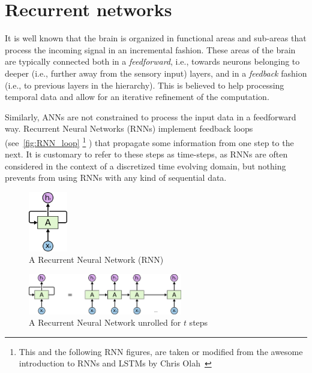 \section{Recurrent networks}\label{sec:rnn}
%
It is well known that the brain is organized in functional areas and sub-areas
that process the incoming signal in an incremental fashion. These areas of the
brain are typically connected both in a \emph{feedforward}, i.e., towards
neurons belonging to deeper (i.e., further away from the sensory input) layers,
and in a \emph{feedback} fashion (i.e., to previous layers in the hierarchy).
This is believed to help processing temporal data and allow for an iterative
refinement of the computation.

Similarly, ANNs are not constrained to process the input data in a feedforward
way. Recurrent Neural Networks (RNNs) implement feedback loops
(see~\autoref{fig:RNN_loop} \footnote{This and the following RNN figures, are
    taken or modified from the awesome introduction to RNNs and LSTMs by Chris
    Olah~\citep{olah2015rnns}}
) that propagate some information from one step to
the next. It is customary to refer to these steps as time-steps, as RNNs are
often considered in the context of a discretized time evolving domain, but
nothing prevents from using RNNs with any kind of sequential data.

\begin{figure}[t]
    \centering
    \includegraphics[width=0.15\textwidth]{pdf/RNN_loop.pdf}
    \caption{A Recurrent Neural Network (RNN)\label{fig:RNN_loop}}
\end{figure}

\begin{figure}[t!]
    \centering
    \includegraphics[width=0.6\textwidth]{pdf/RNN_unrolled.pdf}
    \caption{A Recurrent Neural Network unrolled for $t$%
             steps\label{fig:RNN_unrolled}}
\end{figure}

